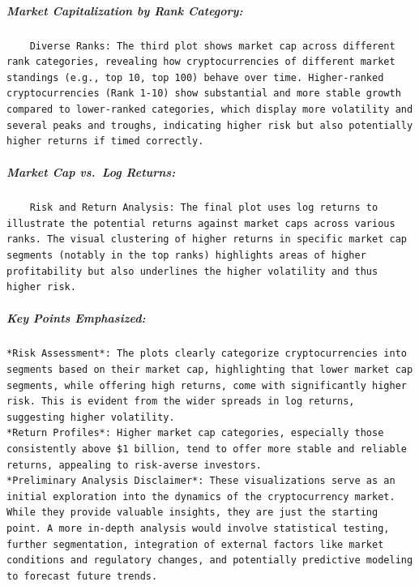 \documentclass[
]{article}
\begin{document}
\hypertarget{market-capitalization-by-rank-category}{%
\subparagraph{Market Capitalization by Rank
Category:}\label{market-capitalization-by-rank-category}}

\begin{verbatim}
    Diverse Ranks: The third plot shows market cap across different rank categories, revealing how cryptocurrencies of different market standings (e.g., top 10, top 100) behave over time. Higher-ranked cryptocurrencies (Rank 1-10) show substantial and more stable growth compared to lower-ranked categories, which display more volatility and several peaks and troughs, indicating higher risk but also potentially higher returns if timed correctly.
\end{verbatim}

\hypertarget{market-cap-vs.-log-returns}{%
\subparagraph{Market Cap vs.~Log
Returns:}\label{market-cap-vs.-log-returns}}

\begin{verbatim}
    Risk and Return Analysis: The final plot uses log returns to illustrate the potential returns against market caps across various ranks. The visual clustering of higher returns in specific market cap segments (notably in the top ranks) highlights areas of higher profitability but also underlines the higher volatility and thus higher risk.
\end{verbatim}

\hypertarget{key-points-emphasized}{%
\subparagraph{Key Points Emphasized:}\label{key-points-emphasized}}

\begin{verbatim}
*Risk Assessment*: The plots clearly categorize cryptocurrencies into segments based on their market cap, highlighting that lower market cap segments, while offering high returns, come with significantly higher risk. This is evident from the wider spreads in log returns, suggesting higher volatility.
*Return Profiles*: Higher market cap categories, especially those consistently above $1 billion, tend to offer more stable and reliable returns, appealing to risk-averse investors.
*Preliminary Analysis Disclaimer*: These visualizations serve as an initial exploration into the dynamics of the cryptocurrency market. While they provide valuable insights, they are just the starting point. A more in-depth analysis would involve statistical testing, further segmentation, integration of external factors like market conditions and regulatory changes, and potentially predictive modeling to forecast future trends.
\end{verbatim}
\end{document}
